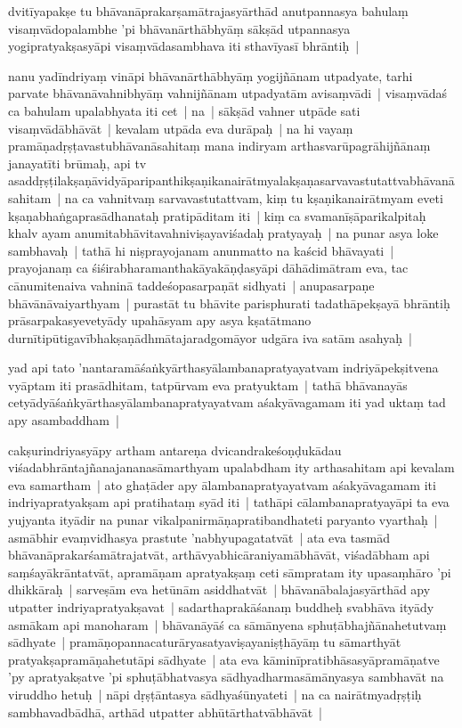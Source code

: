 \documentclass[article,a4paper]{memoir}
\begin{document}
	  \pstart dvitī\-yapakṣe tu bhā\-vanā\-prakarṣamā\-trajasyā\-rthā\-d anutpannasya bahulaṃ visaṃvā\-dopalambhe 'pi bhā\-vanā\-rthā\-bhyā\-ṃ sā\-kṣā\-d utpannasya yogipratyakṣasyā\-pi visaṃvā\-dasambhava iti sthavī\-yasī\- bhrā\-ntiḥ | 
	\pend
      

	  \pstart nanu yadī\-ndriyaṃ vinā\-pi bhā\-vanā\-rthā\-bhyā\-ṃ yogijñā\-nam utpadyate, tarhi parvate bhā\-vanā\-vahnibhyā\-ṃ vahnijñā\-nam utpadyatā\-m avisaṃvā\-di | visaṃvā\-daś ca bahulam upalabhyata iti cet | na | sā\-kṣā\-d vahner utpā\-de sati visaṃvā\-dā\-bhā\-vā\-t | kevalam utpā\-da eva durā\-paḥ | na hi vayaṃ pramā\-ṇadṛṣṭavastubhā\-vanā\-sahitaṃ mana indiryam arthasvarū\-pagrā\-hijñā\-naṃ janayatī\-ti brū\-maḥ, api tv asaddṛṣṭilakṣaṇā\-vidyā\-paripanthikṣaṇikanairā\-tmyalakṣaṇasarvavastutattvabhā\-vanā\-sahitam | na ca vahnitvaṃ sarvavastutattvam, kiṃ tu kṣaṇikanairā\-tmyam eveti kṣaṇabhaṅgaprasā\-dhanataḥ pratipā\-ditam iti | kiṃ ca svamanī\-ṣā\-parikalpitaḥ khalv ayam anumitabhā\-vitavahniviṣayaviśadaḥ pratyayaḥ | na punar asya loke sambhavaḥ | tathā\- hi niṣprayojanam anunmatto na kaścid bhā\-vayati | prayojanaṃ ca śiśirabharamanthakā\-yakā\-ṇḍasyā\-pi dā\-hā\-dimā\-tram eva, tac cā\-numitenaiva vahninā\- taddeśopasarpaṇā\-t sidhyati | anupasarpaṇe bhā\-vā\-nā\-vaiyarthyam | purastā\-t tu bhā\-vite parisphurati tadathā\-pekṣayā\- bhrā\-ntiḥ prā\-sarpakasyevetyā\-dy upahā\-syam apy asya kṣatā\-tmano durnī\-tipū\-tigavī\-bhakṣaṇā\-dhmā\-tajaradgomā\-yor udgā\-ra iva satā\-m asahyaḥ | 
	\pend
      

	  \pstart yad api tato 'nantaramā\-śaṅkyā\-rthasyā\-lambanapratyayatvam indriyā\-pekṣitvena vyā\-ptam iti prasā\-dhitam, tatpū\-rvam eva pratyuktam | tathā\- bhā\-vanayā\-s cetyā\-dyā\-śaṅkyā\-rthasyā\-lambanapratyayatvam aśakyā\-vagamam iti yad uktaṃ tad apy asambaddham | 
	\pend
      

	  \pstart cakṣurindriyasyā\-py artham antareṇa dvicandrakeśoṇḍukā\-dau viśadabhrā\-ntajñanajananasā\-marthyam upalabdham ity arthasahitam api kevalam eva samartham | ato ghaṭā\-der apy ā\-lambanapratyayatvam aśakyā\-vagamam iti indriyapratyakṣam api pratihataṃ syā\-d iti | tathā\-pi cā\-lambanapratyayā\-pi ta eva yujyanta ityā\-dir na punar vikalpanirmā\-ṇapratibandhateti paryanto vyarthaḥ | asmā\-bhir evaṃvidhasya prastute 'nabhyupagatatvā\-t | ata eva tasmā\-d bhā\-vanā\-prakarśamā\-trajatvā\-t, arthā\-vyabhicā\-raniyamā\-bhā\-vā\-t, viśadā\-bham api saṃśayā\-krā\-ntatvā\-t, apramā\-ṇam apratyakṣaṃ ceti sā\-mpratam ity upasaṃhā\-ro 'pi dhikkā\-raḥ | sarveṣā\-m eva hetū\-nā\-m asiddhatvā\-t | bhā\-vanā\-balajasyā\-rthā\-d apy utpatter indriyapratyakṣavat | sadarthaprakā\-śanaṃ buddheḥ svabhā\-va ityā\-dy asmā\-kam api manoharam | bhā\-vanā\-yā\-ś ca sā\-mā\-nyena sphuṭā\-bhajñā\-nahetutvaṃ sā\-dhyate | pramā\-ṇopannacaturā\-ryasatyaviṣayaniṣṭhā\-yā\-ṃ tu sā\-marthyā\-t pratyakṣapramā\-ṇahetutā\-pi sā\-dhyate | ata eva kā\-minī\-pratibhā\-sasyā\-pramā\-ṇatve 'py apratyakṣatve 'pi sphuṭā\-bhatvasya sā\-dhyadharmasā\-mā\-nyasya sambhavā\-t na viruddho hetuḥ | nā\-pi dṛṣṭā\-ntasya sā\-dhyaśū\-nyateti | na ca nairā\-tmyadṛṣṭiḥ sambhavadbā\-dhā\-, arthā\-d utpatter abhū\-tā\-rthatvā\-bhā\-vā\-t | 
	\pend
      
\end{document}
